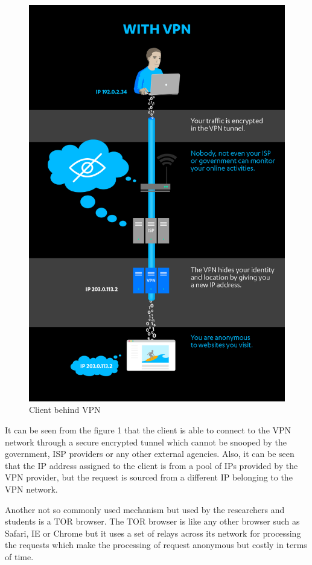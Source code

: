 \documentclass[10pt, a4paper, twocolumn]{article} %
\begin{document}
\begin{figure}
	\includegraphics[width=\linewidth]{VPN.jpg} %
	\caption{Client behind VPN} %
	\label{VPN} %
\end{figure}
It can be seen from the figure 1 that the client is able to connect to the VPN network through a secure encrypted tunnel which cannot be snooped by the government, ISP providers or any other external agencies. Also, it can be seen that the IP address assigned to the client is from a pool of IPs provided by the VPN provider, but the request is sourced from a different IP belonging to the VPN network.\newline

Another not so commonly used mechanism but used by the researchers and students is a TOR browser. The TOR browser is like any other browser such as Safari, IE or Chrome but it uses a set of relays across its network for processing the requests which make the processing of request anonymous but costly in terms of time.
\newline
\end{document}
